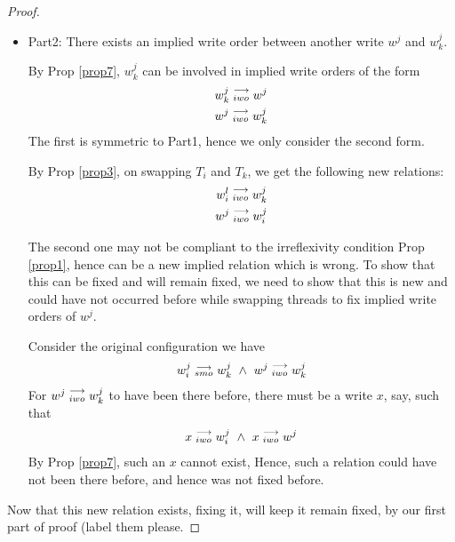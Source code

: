 \begin{proof}
\begin{itemize}
                    \item Part2: There exists an implied write order between another write $w^j$ and $w_k^j$. 
                    
                    By Prop \ref{prop7}, $w_k^j$ can be involved in implied write orders of the form
                    \begin{align*}
                        w_k^j\stackrel{\longrightarrow}{_{iwo}}w^j \\
                        w^j\stackrel{\longrightarrow}{_{iwo}}w_k^j 
                    \end{align*}
                    The first is symmetric to Part1, hence we only consider the second form. 

                    By Prop \ref{prop3}, on swapping $T_i$ and $T_k$, we get the following new relations:
                    \begin{align*}
                        w_i^l\stackrel{\longrightarrow}{_{iwo}}w_k^j \\
                        w^j\stackrel{\longrightarrow}{_{iwo}}w_i^j
                    \end{align*}

                    The second one may not be compliant to the irreflexivity condition Prop \ref{prop1}, hence can be a new implied relation which is wrong. To show that this can be fixed and will remain fixed, we need to show that this is new and could have not occurred before while swapping threads to fix implied write orders of $w^j$. 
                    
                    Consider the original configuration we have 
                    \begin{align*}
                        \reln{w_i^j}{smo}{w_k^j} \ \wedge \ \reln{w^j}{iwo}{w_k^j}
                    \end{align*}
                    For $w^j\stackrel{\longrightarrow}{_{iwo}}w_k^j$ to have been there before, there must be a write $x$, say, such that 
                    \begin{align*}
                        \reln{x}{iwo}{w_i^j} \ \wedge \ \reln{x}{iwo}{w^j}
                    \end{align*}
                    By Prop \ref{prop7}, such an $x$ cannot exist, Hence, such a relation could have not been there before, and hence was not fixed before.

                \end{itemize}
                    Now that this new relation exists, fixing it, will keep it remain fixed, by our first part of proof (label them please. 
                    

\end{proof}
